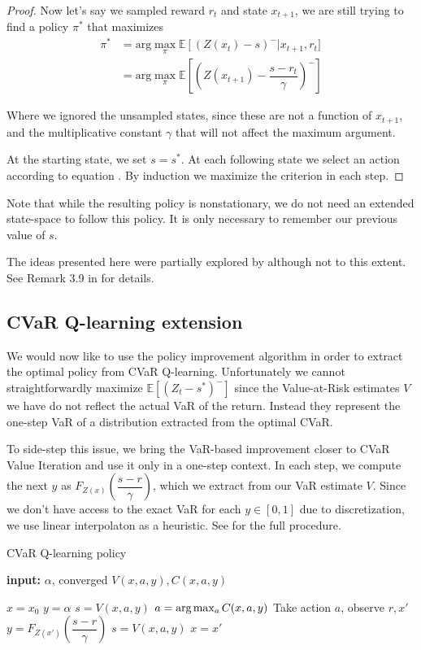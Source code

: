 \begin{proof}
Now let's say we sampled reward $r_t$ and state $x_{t+1}$, we are still trying to find a policy $\pi^*$ that maximizes 
\begin{equation}\label{eqn:sampled x_t+1}
\begin{split}
\pi^* &=\text{arg}\max_\pi \mathbb{E}\left[(Z(x_t)-s)^-\right | x_{t+1}, r_t]\\
&= \text{arg}\max_\pi \mathbb{E}\left[\left(Z(x_{t+1}) - \dfrac{s - r_t}{\gamma}\right)^-\right]
\end{split}
\end{equation}

Where we ignored the unsampled states, since these are not a function of $x_{t+1}$, and the multiplicative constant $\gamma$ that will not affect the maximum argument.

At the starting state, we set $s=s^*$. At each following state we select an action according to equation . By induction we maximize the criterion  in each step.
\end{proof}

Note that while the resulting policy is nonstationary, we do not need an extended state-space to follow this policy. It is only necessary to remember our previous value of $s$.

The ideas presented here were partially explored by \citet{bauerle2011markov} although not to this extent. See Remark 3.9 in \citep{bauerle2011markov} for details.

\subsection{CVaR Q-learning extension}
We would now like to use the policy improvement algorithm in order to extract the optimal policy from CVaR Q-learning. Unfortunately we cannot straightforwardly maximize $\mathbb{E}\left[(Z_t-s^*)^-\right]$ since the Value-at-Risk estimates $V$ we have do not reflect the actual VaR of the return. Instead they represent the one-step VaR of a distribution extracted from the optimal CVaR.

To side-step this issue, we bring the VaR-based improvement closer to CVaR Value Iteration and use it only in a one-step context. In each step, we compute the next $y$ as $F_{Z(x)}(\dfrac{s-r}{\gamma})$, which we extract from our VaR estimate $V$. Since we don't have access to the exact VaR for each $y \in [0,1]$ due to discretization, we use linear interpolaton as a heuristic. See  for the full procedure.
\begin{algorithm}
\caption{CVaR Q-learning policy}\label{alg:varxibasedpolicy}
\begin{algorithmic}
    \STATE \textbf{input:} $\alpha$, converged $V(x, a, y), C(x, a, y)$
    		
	\STATE $x = x_0$
	\STATE $y = \alpha$
	\STATE $s = V(x, a, y)$
	\STATE $a = \text{arg}\max_a C(x, a, y)$
	\STATE Take action $a$, observe $r, x'$
	\STATE $y = F_{Z(x')}(\dfrac{s-r}{\gamma})$
	\STATE $s = V(x, a, y)$
	\STATE $x = x'$
	\ENDWHILE
\end{algorithmic}
\end{algorithm}

